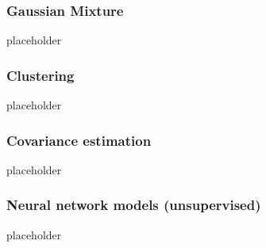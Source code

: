 	\subsubsection*{Gaussian Mixture}
	{\color{red} placeholder}
	\subsubsection*{Clustering}
	{\color{red} placeholder}
	\subsubsection*{Covariance estimation}
	{\color{red} placeholder}
	\subsubsection*{Neural network models (unsupervised)}
	{\color{red} placeholder}
	
	
	
	
	
	
	
	
	
	
	
	
		
	